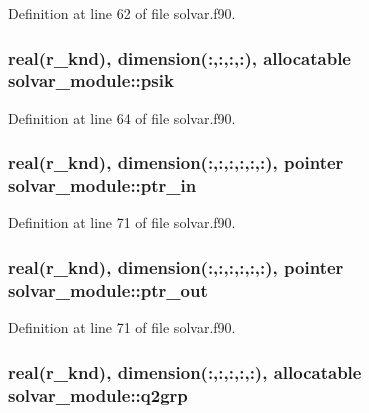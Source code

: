 Definition at line 62 of file solvar.\-f90.

\hypertarget{classsolvar__module_a9d00ffefc30874b3b293efb307b3e551}{
\subsubsection[{psik}]{\setlength{\rightskip}{0pt plus 5cm}real(r\-\_\-knd), dimension(\-:,\-:,\-:,\-:), allocatable solvar\-\_\-module\-::psik}}\label{classsolvar__module_a9d00ffefc30874b3b293efb307b3e551}


Definition at line 64 of file solvar.\-f90.

\hypertarget{classsolvar__module_ac95d5a5e2f90e8f827801c3616afd3cc}{
\subsubsection[{ptr\-\_\-in}]{\setlength{\rightskip}{0pt plus 5cm}real(r\-\_\-knd), dimension(\-:,\-:,\-:,\-:,\-:,\-:), pointer solvar\-\_\-module\-::ptr\-\_\-in}}\label{classsolvar__module_ac95d5a5e2f90e8f827801c3616afd3cc}


Definition at line 71 of file solvar.\-f90.

\hypertarget{classsolvar__module_aaa582c1084c73e20d39d834455a825d1}{
\subsubsection[{ptr\-\_\-out}]{\setlength{\rightskip}{0pt plus 5cm}real(r\-\_\-knd), dimension(\-:,\-:,\-:,\-:,\-:,\-:), pointer solvar\-\_\-module\-::ptr\-\_\-out}}\label{classsolvar__module_aaa582c1084c73e20d39d834455a825d1}


Definition at line 71 of file solvar.\-f90.

\hypertarget{classsolvar__module_a251ab88a6dab1f3da07d22096331b932}{
\subsubsection[{q2grp}]{\setlength{\rightskip}{0pt plus 5cm}real(r\-\_\-knd), dimension(\-:,\-:,\-:,\-:,\-:), allocatable solvar\-\_\-module\-::q2grp}}\label{classsolvar__module_a251ab88a6dab1f3da07d22096331b932}



